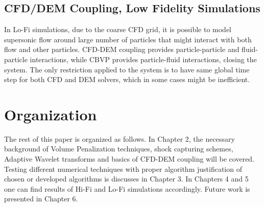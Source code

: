 \subsection{CFD/DEM Coupling, Low Fidelity Simulations}
In Lo-Fi simulations, due to the coarse CFD grid, it is possible to model supersonic flow around large number of particles that might interact with both flow and other particles. CFD-DEM coupling provides particle-particle and fluid-particle interactions, while CBVP provides particle-fluid interactions, closing the system. The only restriction applied to the system is to have same global time step for both CFD and DEM solvers, which in some cases might be inefficient. 


\section{Organization}
The rest of this paper is organized as follows. In Chapter 2, the necessary background of Volume Penalization techniques, shock capturing schemes, Adaptive Wavelet transforms and basics of CFD-DEM coupling will be covered. Testing different numerical techniques with proper algorithm justification of chosen or developed algorithms is discusses in Chapter 3. In Chapters 4 and 5 one can find results of Hi-Fi and Lo-Fi simulations accordingly. Future work is presented in Chapter 6.